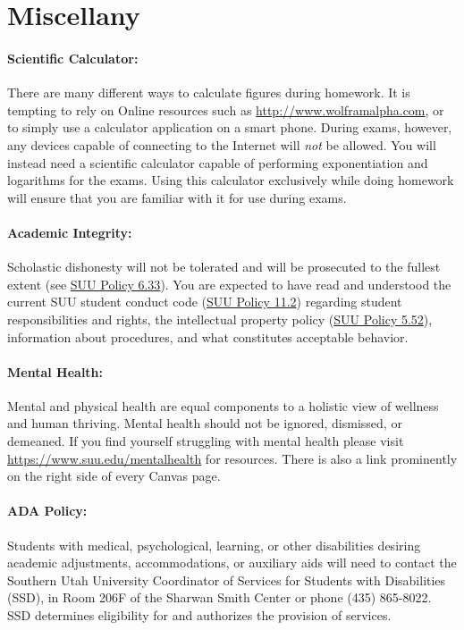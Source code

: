 \documentclass[12pt, letterpaper]{article}
\begin{document}
\section*{Miscellany}

\paragraph{Scientific Calculator:}
There are many different ways to calculate figures during homework. It is tempting to rely on Online resources such as \href{http://www.wolframalpha.com}{http://www.wolframalpha.com}, or to simply use a calculator application on a smart phone. During exams, however, any devices capable of connecting to the Internet will \emph{not} be allowed. You will instead need a scientific calculator capable of performing exponentiation and logarithms for the exams. Using this calculator exclusively while doing homework will ensure that you are familiar with it for use during exams.

\paragraph{Academic Integrity:}
Scholastic dishonesty will not be tolerated and will be prosecuted to the fullest extent (see \href{https://www.suu.edu/policies/06/33.html}{SUU Policy 6.33}). You are expected to have read and understood the current SUU student conduct code (\href{https://www.suu.edu/policies/11/02.html}{SUU Policy 11.2}) regarding student responsibilities and rights, the intellectual property policy (\href{https://www.suu.edu/policies/05/52.html}{SUU Policy 5.52}), information about procedures, and what constitutes acceptable behavior.

\paragraph{Mental Health:}
Mental and physical health are equal components to a holistic view of wellness and human thriving. Mental health should not be ignored, dismissed, or demeaned. If you find yourself struggling with mental health please visit \href{https://www.suu.edu/mentalhealth}{https://www.suu.edu/mentalhealth} for resources. There is also a link prominently on the right side of every Canvas page.

\paragraph{ADA Policy:}
Students with medical, psychological, learning, or other disabilities desiring academic adjustments, accommodations, or auxiliary aids will need to contact the Southern Utah University Coordinator of Services for Students with Disabilities (SSD), in Room 206F of the Sharwan Smith Center or phone (435) 865-8022. SSD determines eligibility for and authorizes the provision of services.
\end{document}
